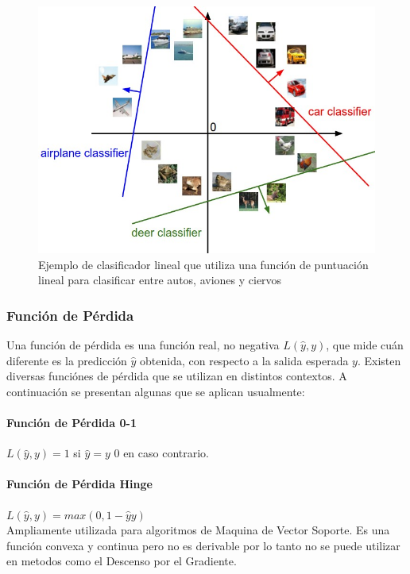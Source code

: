 \documentclass[a4paper,11pt,spanish]{book}
\begin{document}
	  \begin{figure}[h]
	    \includegraphics[scale=0.5]{./img/stanford_linear_class.jpeg}
	    \caption{Ejemplo de clasificador lineal que utiliza una función de puntuación lineal para clasificar entre autos, aviones y ciervos}
	    \label{fig:figure2}
	  \end{figure}
	  
	\subsubsection{Función de Pérdida}
	  Una función de pérdida es una función real, no negativa $L({\widehat y}, y)$, que mide cuán diferente es la predicción ${\widehat y}$ obtenida, con respecto a la
	  salida esperada $y$. Existen diversas funciónes de pérdida que se utilizan en distintos contextos. A continuación se presentan algunas que se aplican usualmente:
	  \paragraph{Función de Pérdida 0-1} $L({\widehat y}, y) =  1$ si ${\widehat y} = y $ $0$ en caso contrario. 
	  \paragraph{Función de Pérdida Hinge}  $L({\widehat y}, y) =  max(0, 1 - {\widehat y}y)$\\ 
	    Ampliamente utilizada para algoritmos de Maquina de Vector Soporte. 
	    Es una función convexa y continua pero no es derivable por lo tanto no se puede utilizar en metodos como el Descenso por el Gradiente. 
\end{document}
